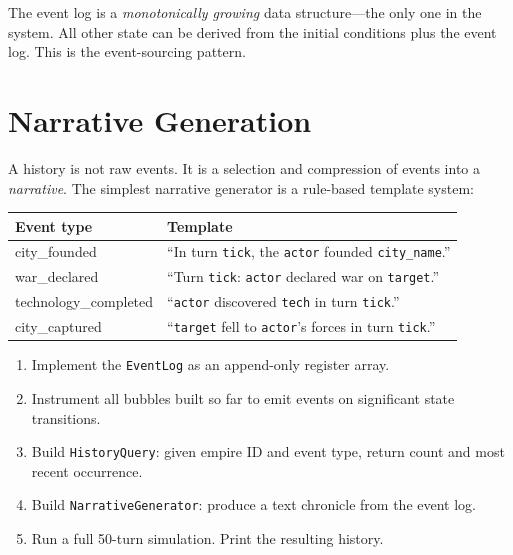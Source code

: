 \documentclass[11pt,a4paper,openany]{book}
\theoremstyle{plain}
\theoremstyle{definition}
\theoremstyle{remark}
\newenvironment{project}[1]{%
  \begin{tcolorbox}[
    title={\textbf{Project: #1}},
    colback=projectbg,
    colframe=sphereblue,
    fonttitle=\bfseries\color{white},
    coltitle=white,
    attach boxed title to top left={yshift=-2mm, xshift=4mm},
    boxed title style={colback=sphereblue, sharp corners},
    sharp corners,
    breakable,
    before upper={\normalfont\setlength{\parindent}{0pt}\tolerance=9999\hbadness=9999}
  ]
}{\end{tcolorbox}}
\begin{document}
The event log is a \emph{monotonically growing} data structure---the
only one in the system. All other state can be derived from the initial
conditions plus the event log. This is the event-sourcing pattern.

\section{Narrative Generation}

A history is not raw events. It is a selection and compression of events
into a \emph{narrative}. The simplest narrative generator is a rule-based
template system:

\begin{center}
\begin{tabular}{ll}
  \toprule
  \textbf{Event type}   & \textbf{Template} \\
  \midrule
  city\_founded         & ``In turn \texttt{tick}, the \texttt{actor} founded
                          \texttt{city\_name}.'' \\
  war\_declared         & ``Turn \texttt{tick}: \texttt{actor} declared war
                          on \texttt{target}.'' \\
  technology\_completed & ``\texttt{actor} discovered \texttt{tech} in turn
                          \texttt{tick}.'' \\
  city\_captured        & ``\texttt{target} fell to \texttt{actor}'s forces
                          in turn \texttt{tick}.'' \\
  \bottomrule
\end{tabular}
\end{center}

\begin{project}{Procedural History}
  \begin{enumerate}
    \item Implement the \texttt{EventLog} as an append-only register array.
    \item Instrument all bubbles built so far to emit events on
          significant state transitions.
    \item Build \texttt{HistoryQuery}: given empire ID and event type,
          return count and most recent occurrence.
    \item Build \texttt{NarrativeGenerator}: produce a text chronicle
          from the event log.
    \item Run a full 50-turn simulation. Print the resulting history.
  \end{enumerate}
\end{project}
\end{document}
